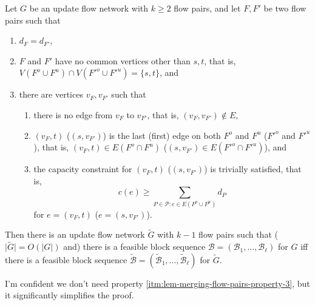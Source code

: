 \documentclass[fontsize=11pt,paper=a4]{book}
\begin{document}
\begin{lem}
Let \(G\) be an update flow network with \(k\geq 2\) flow pairs, and let \(F,F'\) be two flow pairs such that

\begin{enumerate}
\item \label{itm:lem-merging-flow-pairs-property-1}
\(d_F=d_{F'}\),

\item \label{itm:lem-merging-flow-pairs-property-2}
\(F\) and \(F'\) have no common vertices other than \(s,t\), that is, \(V(F^o\cup F^u)\cap V(F'^o\cup F'^u)=\{s,t\}\), and

\item \label{itm:lem-merging-flow-pairs-property-3}
there are vertices \(v_F,v_{F'}\) such that

\begin{enumerate}
\item \label{itm:lem-merging-flow-pairs-property-3-1}
there is no edge from \(v_F\) to \(v_{F'}\), that is, \((v_F,v_{F'})\notin E\),

\item \label{itm:lem-merging-flow-pairs-property-3-2}
\((v_F,t)\) (\((s,v_{F'})\)) is the last (first) edge on both \(F^o\) and \(F^u\) (\(F'^o\) and \(F'^u\)), that is, \((v_F,t)\in E(F^o\cap F^u)\) (\((s,v_{F'})\in E(F'^o\cap F'^u)\)), and

\item \label{itm:lem-merging-flow-pairs-property-3-3}
the capacity constraint for \((v_F,t)\) (\((s,v_{F'})\)) is trivially satisfied, that is,
\[
      c(e)\geq\sum_{P\in\mathcal{P}:e\in E(P^o\cup P^u)}d_P
      \]
for \(e=(v_F,t)\) (\(e=(s,v_{F'})\)).
\end{enumerate}
\end{enumerate}


Then there is an update flow network \(\tilde{G}\) with \(k-1\) flow pairs such that (\(\lvert\tilde{G}\rvert=O(\lvert G\rvert)\) and) there is a feasible block sequence \(\mathcal{B}=(\mathscr{B}_1,\dots,\mathscr{B}_{\ell})\) for \(G\) iff there is a feasible block sequence \(\tilde{\mathcal{B}}=(\tilde{\mathscr{B}}_1,\dots,\tilde{\mathscr{B}}_{\ell})\) for \(\tilde{G}\).
\label{org44b4347}
\end{lem}

\begin{remark}
I'm confident we don't need property \ref{itm:lem-merging-flow-pairs-property-3}, but it significantly simplifies the proof.
\end{remark}
\end{document}
